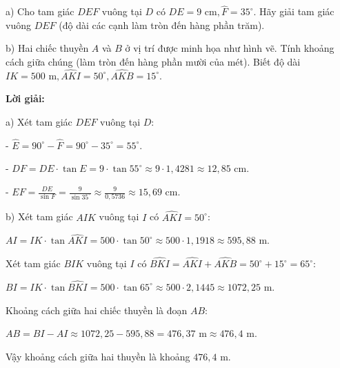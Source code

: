 \documentclass[12pt,a4paper]{article}
\begin{document}
a) Cho tam giác $DEF$ vuông tại $D$ có $DE = 9\text{ cm}, \widehat{F} = 35^\circ$. Hãy giải tam giác vuông $DEF$ (độ dài các cạnh làm tròn đến hàng phần trăm).\par b) Hai chiếc thuyền $A$ và $B$ ở vị trí được minh họa như hình vẽ. Tính khoảng cách giữa chúng (làm tròn đến hàng phần mười của mét). Biết độ dài $IK = 500\text{ m}, \widehat{AKI} = 50^\circ, \widehat{AKB} = 15^\circ$.
\begin{center}
\end{center}

\noindent\textbf{Lời giải:}

a) Xét tam giác $DEF$ vuông tại $D$:\par - $\widehat{E} = 90^\circ - \widehat{F} = 90^\circ - 35^\circ = 55^\circ$.\par - $DF = DE \cdot \tan E = 9 \cdot \tan 55^\circ \approx 9 \cdot 1{,}4281 \approx 12{,}85\text{ cm}$.\par - $EF = \frac{DE}{\sin F} = \frac{9}{\sin 35^\circ} \approx \frac{9}{0{,}5736} \approx 15{,}69\text{ cm}$.\par b) Xét tam giác $AIK$ vuông tại $I$ có $\widehat{AKI} = 50^\circ$:\par $AI = IK \cdot \tan \widehat{AKI} = 500 \cdot \tan 50^\circ \approx 500 \cdot 1{,}1918 \approx 595{,}88\text{ m}$.\par Xét tam giác $BIK$ vuông tại $I$ có $\widehat{BKI} = \widehat{AKI} + \widehat{AKB} = 50^\circ + 15^\circ = 65^\circ$:\par $BI = IK \cdot \tan \widehat{BKI} = 500 \cdot \tan 65^\circ \approx 500 \cdot 2{,}1445 \approx 1072{,}25\text{ m}$.\par Khoảng cách giữa hai chiếc thuyền là đoạn $AB$:\par $AB = BI - AI \approx 1072{,}25 - 595{,}88 = 476{,}37\text{ m} \approx 476{,}4\text{ m}$.\par Vậy khoảng cách giữa hai thuyền là khoảng $476{,}4\text{ m}$.
\end{document}
